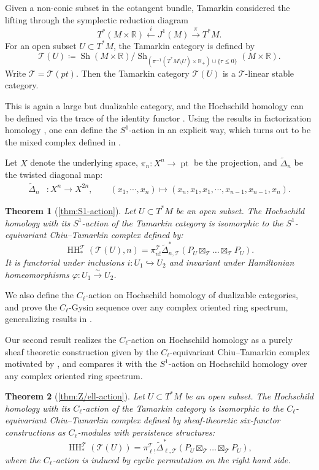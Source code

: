 \documentclass[11pt]{amsart}
\numberwithin{equation}{section}
\theoremstyle{plain}
\newtheorem{Thm}{Theorem}[section]
\theoremstyle{definition}
\theoremstyle{remark}
\newcommand{\bR} { {\mathbb{R}}}
\newcommand{\sT} { {\mathscr{T}}}
\newcommand{\pt}{{\operatorname{pt}}}
\newcommand{\Sh} { {\operatorname{Sh}}}
\newcommand\HH{\operatorname{HH}}
\begin{document}
Given a non-conic subset in the cotangent bundle, Tamarkin \cite{tamarkin2013} considered the lifting through the symplectic reduction diagram
\[T^*(M \times \bR) \xleftarrow{i} J^1(M) \xrightarrow{\pi} T^*M.\]
For an open subset $U \subset T^*M$, the Tamarkin category is defined by
\[\sT(U) \coloneqq \Sh(M \times \bR) / \Sh_{(\pi^{-1}(T^*M\setminus U) \times \bR_+) \cup \{\tau \leq 0\}}(M \times \bR).\]
Write $\sT = \sT(pt)$. Then the Tamarkin category $\sT(U)$ is a $\sT$-linear stable category.

This is again a large but dualizable category, and the Hochschild homology can be defined via the trace of the identity functor \cite{Hoyois-Scherotzke-Sibilla}. Using the results in factorization homology \cite{Ayala-Francis-FH-dim1}, one can define the $S^1$-action in an explicit way, which turns out to be the mixed complex defined in \cite{CyclicZHANG}. 


Let $X$ denote the underlying space, $\pi_{n} : X^n  \rightarrow \pt$ be the projection, and $\widetilde{\Delta}_n$ be the twisted diagonal map:
\begin{align*}
    \widetilde{\Delta}_n&: X^n \rightarrow X^{2n}, \qquad (x_1,\cdots,x_n)\mapsto (x_n,x_1,x_1,\cdots,x_{n-1},x_{n-1},x_n).
\end{align*}

\begin{Thm}[\autoref{thm:S1-action}]
    Let $U \subset T^*M$ be an open subset. The   Hochschild homology with its $S^1$-action of the Tamarkin category is isomorphic to the $S^1$-equivariant Chiu--Tamarkin complex defined by:
    \[\HH_*^\sT(\sT(U), n) = \pi_{n!}^\sT\widetilde{\Delta}_{n,\sT}^*(P_U \boxtimes_\sT \dots \boxtimes_\sT P_U).\]
    It is functorial under inclusions $i: U_1 \hookrightarrow U_2$ and invariant under Hamiltonian homeomorphisms $\varphi: U_1 \xrightarrow{\sim} U_2$.
\end{Thm}

We also define the $C_\ell$-action on Hochschild homology of dualizable categories, and prove the $C_\ell$-Gysin sequence over any complex oriented ring spectrum, generalizing results in \cite{Chen1}.

Our second result realizes the $C_\ell$-action on Hochschild homology as a purely sheaf theoretic construction given by the $C_\ell$-equivariant Chiu--Tamarkin complex \cite{Capacities2021} motivated by \cite{chiu2017}, and compares it with the $S^1$-action on Hochschild homology over any complex oriented ring spectrum.

\begin{Thm}[\autoref{thm:Z/ell-action}]
    Let $U \subset T^*M$ be an open subset. The Hochschild homology with its $C_\ell$-action of the Tamarkin category is isomorphic to the $C_\ell$-equivariant Chiu--Tamarkin complex defined by sheaf-theoretic six-functor constructions as $C_\ell$-modules with persistence structures:
    \[\HH_*^\sT(\sT(U)) = \pi_{\ell!}^\sT\widetilde{\Delta}_{\ell,\sT}^*(P_U \boxtimes_\sT \dots \boxtimes_\sT P_U),\]
    where the $C_\ell$-action is induced by cyclic permutation on the right hand side.
\end{Thm}
\end{document}
